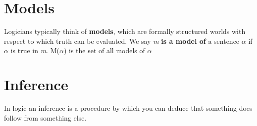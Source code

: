 \documentclass[11pt]{article}
\begin{document}
\section{Models}
\label{sec:orgeaf9148}
Logicians typically think of \textbf{models}, which are formally structured worlds with respect to which truth can be evaluated.
We say \emph{m} \textbf{is a model of} a sentence \(\alpha\) if \(\alpha\) is true in \emph{m}.
M(\(\alpha\)) is the set of all models of \(\alpha\)

\section{Inference}
\label{sec:org42785cc}
In logic an inference is a procedure by which you can deduce that something does follow from something else.
\end{document}
